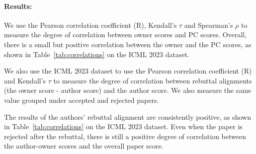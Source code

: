 \documentclass{article} %
\begin{document}
\paragraph{Results:}We use the Pearson correlation coefficient (R), Kendall's $\tau$ and Spearman's $\rho$ to measure the degree of correlation between owner scores and PC scores. Overall, there is a small but positive correlation between the owner and the PC scores, as shown in Table~\ref{tab:correlations} on the \textsc{ICML 2023} dataset.
\begin{table}[t]
\centering
\caption{Correlations between owner and program committee (PC) scores.}
\begin{minipage}[t]{0.48\textwidth}
\centering
{}
\end{minipage}
\hfill
\begin{minipage}[t]{0.48\textwidth}
\centering
{}
\end{minipage}
\label{tab:correlations}
\end{table}

We also use the \textsc{ICML 2023} dataset to use the Pearson correlation coefficient (R) and Kendall's $\tau$ to measure the degree of correlation between rebuttal alignments (the owner score - author score) and the author score. We also measure the same value grouped under accepted and rejected papers.

The results of the authors' rebuttal alignment are consistently positive, as shown in Table~\ref{tab:correlations} on the \textsc{ICML 2023} dataset. Even when the paper is rejected after the rebuttal, there is still a positive degree of correlation between the author-owner scores and the overall paper score. 
\end{document}
